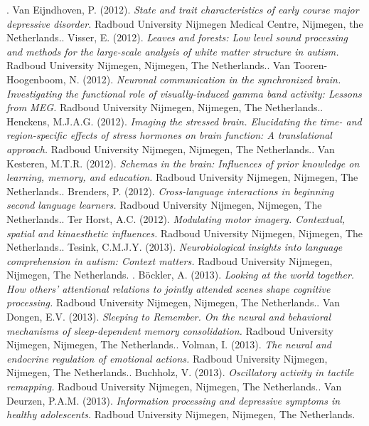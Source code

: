 .	Van Eijndhoven, P. (2012). \emph{State and trait characteristics of early course major depressive disorder.} Radboud University Nijmegen Medical Centre, Nijmegen, the Netherlands.\npar {}.	Visser, E. (2012). \emph{Leaves and forests: Low level sound processing and methods for the large-scale analysis of white matter structure in autism.} Radboud University Nijmegen, Nijmegen, The Netherlands.\npar {}.	Van Tooren-Hoogenboom, N. (2012). \emph{Neuronal communication in the synchronized brain. Investigating the functional role of visually-induced gamma band activity: Lessons from MEG.} Radboud University Nijmegen, Nijmegen, The Netherlands.\npar {}.	Henckens, M.J.A.G. (2012). \emph{Imaging the stressed brain. Elucidating the time- and region-specific effects of stress hormones on brain function: A translational approach.} Radboud University Nijmegen, Nijmegen, The Netherlands.\npar {}.	Van Kesteren, M.T.R. (2012). \emph{Schemas in the brain: Influences of prior knowledge on learning, memory, and education.} Radboud University Nijmegen, Nijmegen, The Netherlands.\npar {}.	Brenders, P. (2012). \emph{Cross-language interactions in beginning second language learners.} Radboud University Nijmegen, Nijmegen, The Netherlands.\npar {}.	Ter Horst, A.C. (2012). \emph{Modulating motor imagery. Contextual, spatial and kinaesthetic influences.} Radboud University Nijmegen, Nijmegen, The Netherlands.\npar {}.	Tesink, C.M.J.Y. (2013). \emph{Neurobiological insights into language comprehension in autism: Context matters.} Radboud University Nijmegen, Nijmegen, The Netherlands.
\npar {}.	B\"ockler, A. (2013). \emph{Looking at the world together. How others' attentional relations to jointly attended scenes shape cognitive processing.} Radboud University Nijmegen, Nijmegen, The Netherlands.\npar {}.	Van Dongen, E.V. (2013). \emph{Sleeping to Remember. On the neural and behavioral mechanisms of sleep-dependent memory consolidation.} Radboud University Nijmegen, Nijmegen, The Netherlands.\npar {}.	Volman, I. (2013). \emph{The neural and endocrine regulation of emotional actions.} Radboud University Nijmegen, Nijmegen, The Netherlands.\npar {}.	Buchholz, V. (2013). \emph{Oscillatory activity in tactile remapping.} Radboud University Nijmegen, Nijmegen, The Netherlands.\npar {}.	Van Deurzen, P.A.M. (2013). \emph{Information processing and depressive symptoms in healthy adolescents.} Radboud University Nijmegen, Nijmegen, The Netherlands.
